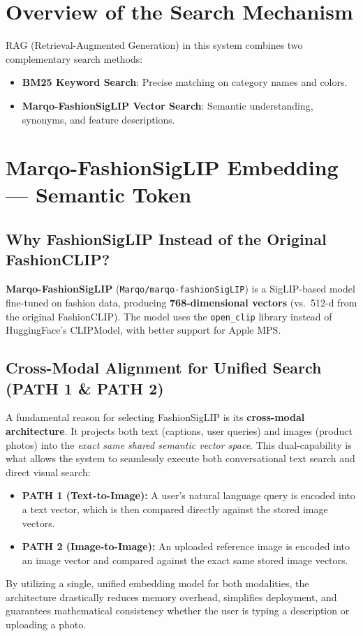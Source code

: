 \section{Overview of the Search Mechanism}
RAG (Retrieval-Augmented Generation) in this system combines two complementary search methods:

\begin{itemize}
    \item \textbf{BM25 Keyword Search}: Precise matching on category names and colors.
    \item \textbf{Marqo-FashionSigLIP Vector Search}: Semantic understanding, synonyms, and feature descriptions.
\end{itemize}

\section{Marqo-FashionSigLIP Embedding --- Semantic Token}

\subsection{Why FashionSigLIP Instead of the Original FashionCLIP?}
\textbf{Marqo-FashionSigLIP} (\texttt{Marqo/marqo-fashionSigLIP}) is a SigLIP-based model fine-tuned on fashion data, producing \textbf{768-dimensional vectors} (vs.\ 512-d from the original FashionCLIP). The model uses the \texttt{open\_clip} library instead of HuggingFace's CLIPModel, with better support for Apple MPS.

\subsection{Cross-Modal Alignment for Unified Search (PATH 1 \& PATH 2)}
A fundamental reason for selecting FashionSigLIP is its \textbf{cross-modal architecture}. It projects both text (captions, user queries) and images (product photos) into the \textit{exact same shared semantic vector space}. This dual-capability is what allows the system to seamlessly execute both conversational text search and direct visual search:
\begin{itemize}
    \item \textbf{PATH 1 (Text-to-Image):} A user's natural language query is encoded into a text vector, which is then compared directly against the stored image vectors.
    \item \textbf{PATH 2 (Image-to-Image):} An uploaded reference image is encoded into an image vector and compared against the exact same stored image vectors.
\end{itemize}
By utilizing a single, unified embedding model for both modalities, the architecture drastically reduces memory overhead, simplifies deployment, and guarantees mathematical consistency whether the user is typing a description or uploading a photo.

